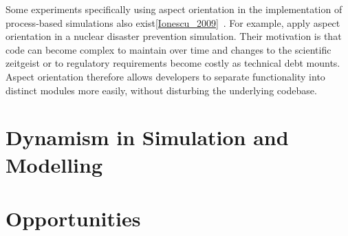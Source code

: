 Some experiments specifically using aspect orientation in the implementation of
process-based simulations also exist\cref{Ionescu_2009}~. For
example, \citeauthor{Ionescu_2009} apply aspect orientation in a nuclear
disaster prevention simulation. Their motivation is that code can become complex
to maintain over time and changes to the scientific zeitgeist or to regulatory
requirements become costly as technical debt mounts. Aspect orientation
therefore allows developers to separate functionality into distinct modules more
easily, without disturbing the underlying codebase.





\section{Dynamism in Simulation and Modelling}





\section{Opportunities}

